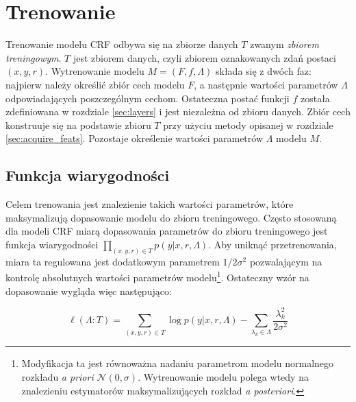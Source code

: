 \documentclass[a4paper,10]{article}
\begin{document}
\section{Trenowanie}\label{sec:training}

Trenowanie modelu CRF odbywa się na zbiorze danych $T$ zwanym
\emph{zbiorem treningowym}. $T$ jest zbiorem danych, czyli
zbiorem oznakowanych zdań postaci $(x, y, r)$. Wytrenowanie
modelu $M = (F, f, \Lambda)$ składa się z dwóch faz:
najpierw należy określić zbiór cech modelu $F$, a następnie
wartości parametrów $\Lambda$ odpowiadających poszczególnym
cechom. Ostateczna postać funkcji $f$ została zdefiniowana
w rozdziale \ref{sec:layers} i jest niezależna od zbioru danych.
Zbiór cech konstruuje się na podstawie zbioru $T$ przy użyciu
metody opisanej w rozdziale \ref{sec:acquire_feats}. 
Pozostaje określenie wartości parametrów $\Lambda$ modelu $M$.

\subsection{Funkcja wiarygodności}

Celem trenowania jest znalezienie takich wartości parametrów, które maksymalizują
dopasowanie modelu do zbioru treningowego.
Często stosowaną dla modeli CRF miarą dopasowania parametrów do zbioru treningowego
jest funkcja wiarygodności $\prod_{(x, y, r) \in T} p(y \vert x, r, \Lambda)$.
Aby uniknąć przetrenowania, miara ta regulowana jest dodatkowym parametrem $1/2\sigma^2$
pozwalającym na kontrolę absolutnych wartości parametrów
modelu\footnote{Modyfikacja ta jest równoważna nadaniu parametrom modelu
normalnego rozkładu \emph{a priori} $\mathcal{N}(0, \sigma)$.
Wytrenowanie modelu polega wtedy na znalezieniu estymatorów maksymalizujących
rozkład \emph{a posteriori}.}.
Ostateczny wzór na dopasowanie wygląda więc następująco:

\begin{equation}
\ell(\Lambda : T) = \sum_{(x, y, r) \in T}
\log p(y \vert x, r, \Lambda) - \sum_{\lambda_k \in \Lambda}
\frac{\lambda_k^2}{2\sigma^2}
\end{equation}
\end{document}
